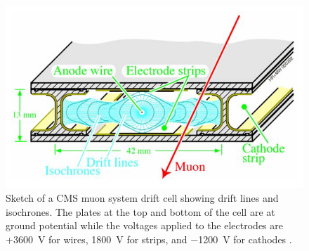 \begin{figure}[hbtp]
\centering
\includegraphics[scale=0.3]{figures/lhc_and_cms/drift_cell}
\caption{Sketch of a CMS muon system drift cell showing drift lines and isochrones.  The plates at the top and bottom of the cell are at ground potential while the voltages applied to the electrodes are +\SI{+3600}{\V} for wires, \SI{+1800}{\V} for strips, and \SI{-1200}{\V} for cathodes \cite{cms_experiment}.}
\label{drift_cell}
\end{figure}